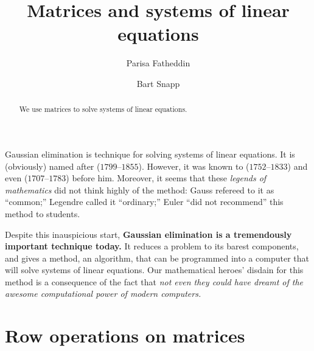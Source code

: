 \documentclass{ximera}
\author{Parisa Fatheddin \and Bart Snapp}
\title{Matrices and systems of linear equations}
\begin{document}
\begin{abstract}
  We use matrices to solve systems of linear equations.
\end{abstract}
\maketitle

Gaussian elimination is technique for solving systems of linear
equations. It is (obviously) named after
($1799$--$1855$). However, it was known to
($1752$--$1833$) and even
($1707$--$1783$) before him. Moreover, it seems that these \textit{legends of
mathematics} did not think highly of the method: Gauss refereed to it
as ``common;'' Legendre called it ``ordinary;'' Euler ``did not
recommend'' this method to students.




Despite this inauspicious start, \textbf{Gaussian elimination is a
  tremendously important technique today.} It reduces a problem to
its barest components, and gives a method, an algorithm, that can be
programmed into a computer that will solve systems of linear
equations. Our mathematical heroes' disdain for this method is a
consequence of the fact that \textit{not even they could have dreamt of the awesome
computational power of modern computers.}



\section{Row operations on matrices}
\end{document}
